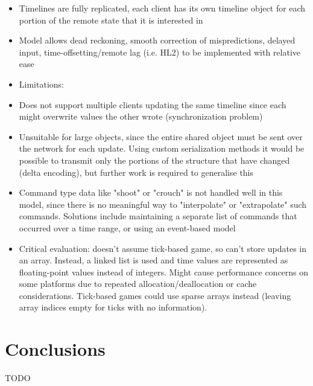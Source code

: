 \documentclass[conference]{IEEEtran}
\begin{document}
\begin{itemize}
		\item Timelines are fully replicated, each client has its own timeline object for each portion of the remote state that it is interested in
		\item Model allows dead reckoning, smooth correction of mispredictions, delayed input, time-offsetting/remote lag (i.e. HL2) to be implemented with relative ease
		\item Limitations:
		\item Does not support multiple clients updating the same timeline since each might overwrite values the other wrote (synchronization problem)
		\item Unsuitable for large objects, since the entire shared object must be sent over the network for each update. Using custom serialization methods it would be possible to transmit only the portions of the structure that have changed (delta encoding), but further work is required to generalise this
		\item Command type data like "shoot" or "crouch" is not handled well in this model, since there is no meaningful way to "interpolate" or "extrapolate" such commands. Solutions include maintaining a separate list of commands that occurred over a time range, or using an event-based model
		\item Critical evaluation: doesn't assume tick-based game, so can't store updates in an array. Instead, a linked list is used and time values are represented as floating-point values instead of integers. Might cause performance concerns on some platforms due to repeated allocation/deallocation or cache considerations. Tick-based games could use sparse arrays instead (leaving array indices empty for ticks with no information).
	\end{itemize}

	\section{Conclusions}

	TODO

	\printbibliography
\end{document}
